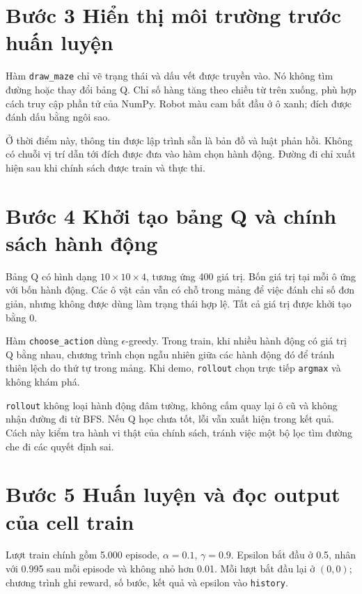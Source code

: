 \clearpage
\section{Bước 3 Hiển thị môi trường trước huấn luyện}
Hàm \texttt{draw\_maze} chỉ vẽ trạng thái và dấu vết được truyền vào. Nó không tìm đường hoặc thay đổi bảng Q. Chỉ số hàng tăng theo chiều từ trên xuống, phù hợp cách truy cập phần tử của NumPy. Robot màu cam bắt đầu ở ô xanh; đích được đánh dấu bằng ngôi sao.



Ở thời điểm này, thông tin được lập trình sẵn là bản đồ và luật phản hồi. Không có chuỗi vị trí dẫn tới đích được đưa vào hàm chọn hành động. Đường đi chỉ xuất hiện sau khi chính sách được train và thực thi.

\clearpage
\section{Bước 4 Khởi tạo bảng Q và chính sách hành động}
Bảng Q có hình dạng $10\times10\times4$, tương ứng 400 giá trị. Bốn giá trị tại mỗi ô ứng với bốn hành động. Các ô vật cản vẫn có chỗ trong mảng để việc đánh chỉ số đơn giản, nhưng không được dùng làm trạng thái hợp lệ. Tất cả giá trị được khởi tạo bằng 0.


Hàm \texttt{choose\_action} dùng $\epsilon$-greedy. Trong train, khi nhiều hành động có giá trị Q bằng nhau, chương trình chọn ngẫu nhiên giữa các hành động đó để tránh thiên lệch do thứ tự trong mảng. Khi demo, \texttt{rollout} chọn trực tiếp \texttt{argmax} và không khám phá.

\texttt{rollout} không loại hành động đâm tường, không cấm quay lại ô cũ và không nhận đường đi từ BFS. Nếu Q học chưa tốt, lỗi vẫn xuất hiện trong kết quả. Cách này kiểm tra hành vi thật của chính sách, tránh việc một bộ lọc tìm đường che đi các quyết định sai.

\clearpage
\section{Bước 5 Huấn luyện và đọc output của cell train}
Lượt train chính gồm 5.000 episode, $\alpha=0.1$, $\gamma=0.9$. Epsilon bắt đầu ở 0.5, nhân với 0.995 sau mỗi episode và không nhỏ hơn 0.01. Mỗi lượt bắt đầu lại ở $(0,0)$; chương trình ghi reward, số bước, kết quả và epsilon vào \texttt{history}.

